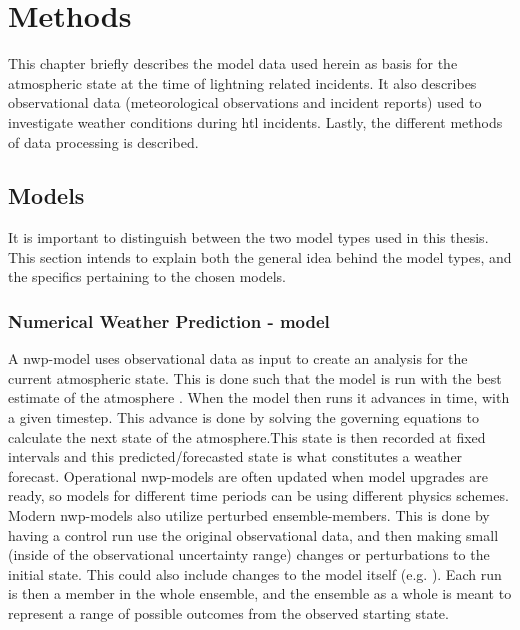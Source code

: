 \setcounter{chapter}{2}
\chapter{Methods}

This chapter briefly describes the model data used herein as basis for the atmospheric state at the time of lightning related incidents. It also describes observational data (meteorological observations and incident reports) used to investigate weather conditions during \acrshort{htl} incidents. Lastly, the different methods of data processing is described.

\section{Models}\label{sec:models}

It is important to distinguish between the two model types used in this thesis. This section intends to explain both the general idea behind the model types, and the specifics pertaining to the chosen models.

\subsection{Numerical Weather Prediction - model}\label{sec:nwp}

A \acrfull{nwp}-model uses observational data as input to create an analysis for the current atmospheric state. This is done such that the model is run with the best estimate of the atmosphere . When the model then runs it advances in time, with a given timestep. This advance is done by solving the governing equations to calculate the next state of the atmosphere.This state is then recorded at fixed intervals and this predicted/forecasted state is what constitutes a weather forecast. Operational \acrshort{nwp}-models are often updated when model upgrades are ready, so models for different time periods can be using different physics schemes. Modern \acrshort{nwp}-models also utilize perturbed ensemble-members. This is done by having a control run use the original observational data, and then making small (inside of the observational uncertainty range) changes or perturbations to the initial state. This could also include changes to the model itself (e.g. \cite{toth1993}). Each run is then a member in the whole ensemble, and the ensemble as a whole is meant to represent a range of possible outcomes from the observed starting state.


